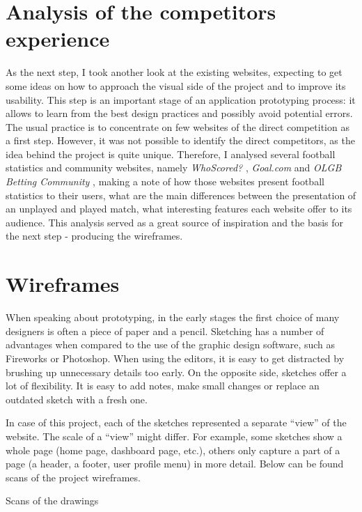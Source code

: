 \section{Analysis of the competitors experience}
\label{sec:competitors_prototype}
As the next step, I took another look at the existing websites, expecting to get some ideas on how to approach the visual side of the project and to improve its usability. This step is an important stage of an application prototyping process: it allows to learn from the best design practices and possibly avoid potential errors. The usual practice is to concentrate on few websites of the direct competition as a first step. However, it was not possible to identify the direct competitors, as the idea behind the project is quite unique. Therefore, I analysed several football statistics and community websites, namely \emph{WhoScored?} \citep{source:whoscored}, \emph{Goal.com} \citep{source:goal} and \emph{OLGB Betting Community} \citep{source:olgb}, making a note of how those websites present football statistics to their users, what are the main differences between the presentation of an unplayed and played match, what interesting features each website offer to its audience. This analysis served as a great source of inspiration and the basis for the next step - producing the wireframes.

\section{Wireframes}
\label{sec:wireframes_prototype}
When speaking about prototyping, in the early stages the first choice of many designers is often a piece of paper and a pencil. Sketching has a number of advantages when compared to the use of the graphic design software, such as Fireworks or Photoshop. When using the editors, it is easy to get distracted by brushing up unnecessary details too early. On the opposite side, sketches offer a lot of flexibility. It is easy to add notes, make small changes or replace an outdated sketch with a fresh one.

In case of this project, each of the sketches represented a separate “view” of the website. The scale of a “view” might differ. For example, some sketches show a whole page (home page, dashboard page, etc.), others only capture a part of a page (a header, a footer, user profile menu) in more detail.  Below can be found scans of the project wireframes.

Scans of the drawings

